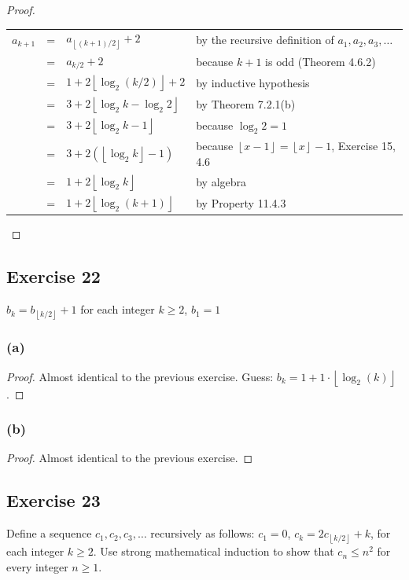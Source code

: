 \documentclass[14pt]{extarticle}
\newcommand{\cy}{\color{cyan}}
\newcommand{\floor}[1]{{\left\lfloor#1\right\rfloor}}
\begin{document}
\begin{proof}
\begin{tabular}{rcll}
\(a_{k+1}\) & = & \(a_{\floor{(k+1)/2}} + 2\) & {\cy by the recursive definition of \(a_1, a_2, a_3, \ldots\)} \\
& = & \(a_{k/2} + 2\) & {\cy because \(k + 1\) is odd (Theorem 4.6.2)} \\
& = & \(1 + 2\floor{\log_2(k/2)} + 2\) & {\cy by inductive hypothesis} \\
& = & \(3 + 2\floor{\log_2 k - \log_2 2}\) & {\cy by Theorem 7.2.1(b)} \\
& = & \(3 + 2\floor{\log_2 k - 1}\) & {\cy because \(\log_2 2 = 1\)} \\
& = & \(3 + 2(\floor{\log_2 k} - 1)\) & {\cy because \(\floor{x-1} = \floor{x}-1\), Exercise 15, 4.6} \\
& = & \(1 + 2\floor{\log_2 k}\) & {\cy by algebra} \\
& = & \(1 + 2\floor{\log_2 (k+1)}\) & {\cy by Property 11.4.3} \\
\end{tabular}
\end{proof}

\subsection{Exercise 22}
\(b_k = b_{\floor{k/2}} + 1\) for each integer \(k \geq 2\), \(b_1 = 1\)

\subsubsection{(a)}
\begin{proof}
Almost identical to the previous exercise. Guess: \(b_k = 1 + 1 \cdot \floor{\log_2(k)}\).
\end{proof}

\subsubsection{(b)}

\begin{proof}
Almost identical to the previous exercise.
\end{proof}

\subsection{Exercise 23}
Define a sequence \(c_1, c_2, c_3, \ldots\) recursively as follows: \(c_1 = 0\), \(c_k = 2c_{\floor{k/2}} + k\), for each 
integer \(k \geq 2\). Use strong mathematical induction to show that \(c_n \leq n^2\) for every integer \(n \geq 1\).
\end{document}
